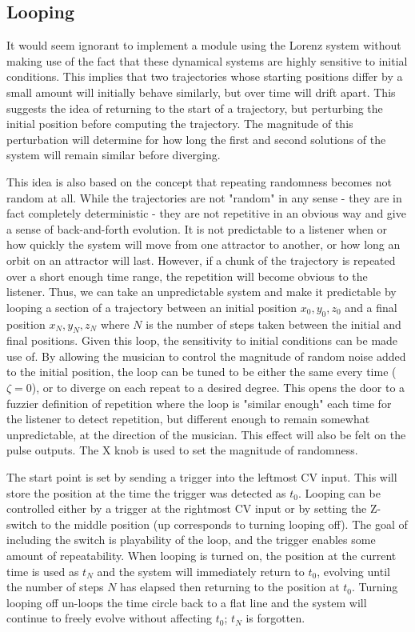 \documentclass{tufte-handout}
\begin{document}
\subsection{Looping}\label{sec:looping}

It would seem ignorant to implement a module using the Lorenz system without making use of the fact that these dynamical systems are highly sensitive to initial conditions. This implies that two trajectories whose starting positions differ by a small amount will initially behave similarly, but over time will drift apart.
This suggests the idea of returning to the start of a trajectory, but perturbing the initial position before computing the trajectory. The magnitude of this perturbation will determine for how long the first and second solutions of the system will remain similar before diverging.

This idea is also based on the concept that repeating randomness becomes not random at all. While the trajectories are not "random" in any sense - they are in fact completely deterministic - they are not repetitive in an obvious way and give a sense of back-and-forth evolution. It is not predictable to a listener when or how quickly the system will move from one attractor to another, or how long an orbit on an attractor will last. However, if a chunk of the trajectory is repeated over a short enough time range, the repetition will become obvious to the listener. Thus, we can take an unpredictable system and make it predictable by looping a section of a trajectory between an initial position $x_0, y_0, z_0$ and a final position $x_N, y_N, z_N$ where $N$ is the number of steps taken between the initial and final positions. Given this loop, the sensitivity to initial conditions can be made use of. By allowing the musician to control the magnitude of random noise added to the initial position, the loop can be tuned to be either the same every time ($\zeta=0$), or to diverge on each repeat to a desired degree. This opens the door to a fuzzier definition of repetition where the loop is "similar enough" each time for the listener to detect repetition, but different enough to remain somewhat unpredictable, at the direction of the musician. This effect will also be felt on the pulse outputs. The X knob is used to set the magnitude of randomness.

The start point is set by sending a trigger into the leftmost CV input. This will store the position at the time the trigger was detected as $t_0$. Looping can be controlled either by a trigger at the rightmost CV input or by setting the Z-switch to the middle position (up corresponds to turning looping off). The goal of including the switch is playability of the loop, and the trigger enables some amount of repeatability. When looping is turned on, the position at the current time is used as $t_N$ and the system will immediately return to $t_0$, evolving until the number of steps $N$ has elapsed then returning to the position at $t_0$. Turning looping off un-loops the time circle back to a flat line and the system will continue to freely evolve without affecting $t_0$; $t_N$ is forgotten.
\end{document}
